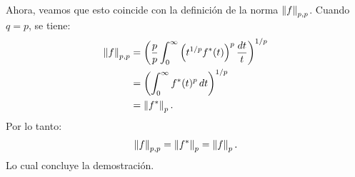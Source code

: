 \begin{homeworkProblem}
\begin{solution}
\begin{itemize}
        Ahora, veamos que esto coincide con la definición de la norma $\left\|f\right\|_{p,p}$. Cuando $q = p$, se tiene:
        \begin{align*}
          \left\|f\right\|_{p,p} 
          &= \left( \frac{p}{p} \int_0^\infty \left( t^{1/p} f^*(t) \right)^p \frac{dt}{t} \right)^{1/p} \\
          &= \left( \int_0^\infty f^*(t)^p \, dt \right)^{1/p} \\
          &= \left\|f^*\right\|_p.
        \end{align*}
        Por lo tanto:
        \begin{align*}
          \left\|f\right\|_{p,p} = \left\|f^*\right\|_p = \left\|f\right\|_p.
        \end{align*}
        Lo cual concluye la demostración.
    \end{itemize}
  \end{solution}
\end{homeworkProblem}

